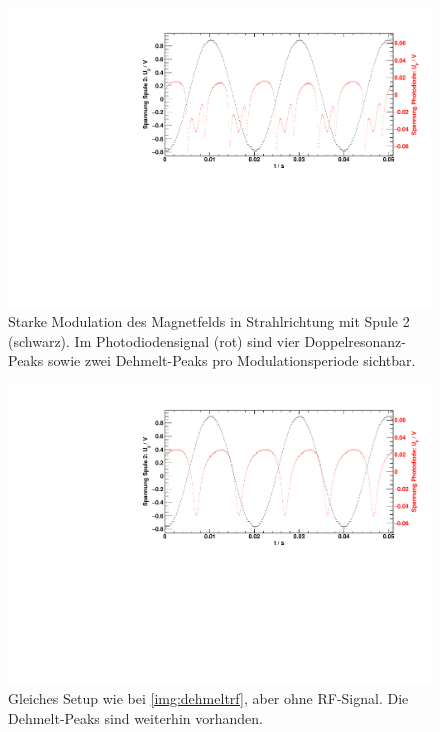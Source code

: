 \begin{figure}[H]
\begin{center}
    \includegraphics[width=\textwidth]{../img/part3/06.pdf}
    \caption{Starke Modulation des Magnetfelds in Strahlrichtung mit Spule 2 (schwarz).
    Im Photodiodensignal (rot) sind vier Doppelresonanz-Peaks sowie
    zwei Dehmelt-Peaks pro Modulationsperiode sichtbar.}
    \label{img:dehmeltrf}
\end{center}
\end{figure}

\begin{figure}[H]
\begin{center}
    \includegraphics[width=\textwidth]{../img/part3/07.pdf}
    \caption{Gleiches Setup wie bei \autoref{img:dehmeltrf}, aber ohne RF-Signal.
    Die Dehmelt-Peaks sind weiterhin vorhanden.}
    \label{img:dehmelt}
\end{center}
\end{figure}

